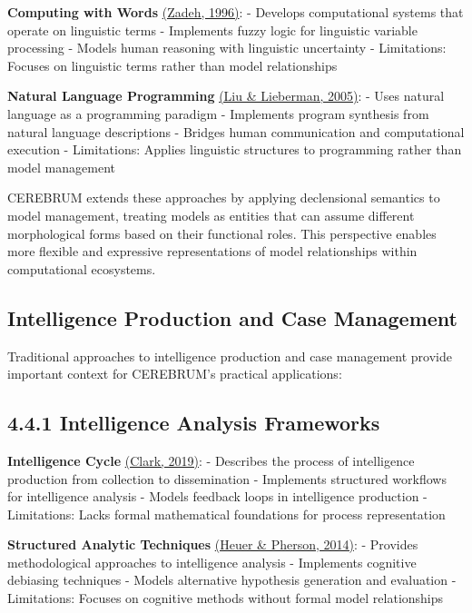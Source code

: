 \documentclass[
  11pt,
  letterpaper,
]{article}
\begin{document}
\textbf{Computing with Words} \protect\hyperlink{references}{(Zadeh,
1996)}: - Develops computational systems that operate on linguistic
terms - Implements fuzzy logic for linguistic variable processing -
Models human reasoning with linguistic uncertainty - Limitations:
Focuses on linguistic terms rather than model relationships

\textbf{Natural Language Programming}
\protect\hyperlink{references}{(Liu \& Lieberman, 2005)}: - Uses natural
language as a programming paradigm - Implements program synthesis from
natural language descriptions - Bridges human communication and
computational execution - Limitations: Applies linguistic structures to
programming rather than model management

CEREBRUM extends these approaches by applying declensional semantics to
model management, treating models as entities that can assume different
morphological forms based on their functional roles. This perspective
enables more flexible and expressive representations of model
relationships within computational ecosystems.

\hypertarget{intelligence-production-and-case-management}{%
\subsection{Intelligence Production and Case
Management}\label{intelligence-production-and-case-management}}

Traditional approaches to intelligence production and case management
provide important context for CEREBRUM's practical applications:

\hypertarget{intelligence-analysis-frameworks}{%
\subsection{4.4.1 Intelligence Analysis
Frameworks}\label{intelligence-analysis-frameworks}}

\textbf{Intelligence Cycle} \protect\hyperlink{references}{(Clark,
2019)}: - Describes the process of intelligence production from
collection to dissemination - Implements structured workflows for
intelligence analysis - Models feedback loops in intelligence production
- Limitations: Lacks formal mathematical foundations for process
representation

\textbf{Structured Analytic Techniques}
\protect\hyperlink{references}{(Heuer \& Pherson, 2014)}: - Provides
methodological approaches to intelligence analysis - Implements
cognitive debiasing techniques - Models alternative hypothesis
generation and evaluation - Limitations: Focuses on cognitive methods
without formal model relationships
\end{document}
